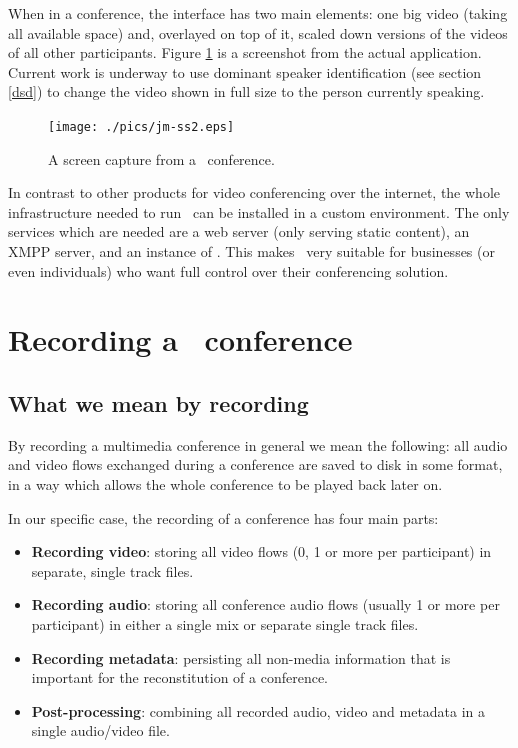 \documentclass[twoside,openright,a4paper,12pt,english]{article}
\begin{document}
When in a conference, the interface has two main elements: one big video
(taking all available space) and, overlayed on top of it,
scaled down versions of the videos of all other participants. Figure
\ref{jm-ss} is a screenshot from the actual application. Current work is underway to
use dominant speaker identification (see section \ref{dsd}) to change the video
shown in full size to the person currently speaking.

\begin{figure}[h]
    \texttt{[image: ./pics/jm-ss2.eps]}
    \caption{A screen capture from a \jm\ conference.}
    \label{jm-ss}
\end{figure}

\medskip
In contrast to other products for video conferencing over the internet, the
whole infrastructure needed to run \jm\ can be installed in a custom
environment. The only services which are needed are a web server
(only serving static content), an XMPP server, and an instance of \jvb. This
makes \jm\ very suitable for businesses (or even individuals) who want full
control over their conferencing solution.



\section{Recording a \jm\ conference}
\label{intro-recording}

\subsection{What we mean by recording}
By recording a multimedia conference in general we mean the following: 
all audio and video flows exchanged during a conference are saved
to disk in some format, in a way which allows the whole conference to
be played back later on.

\medskip
In our specific case, the recording of a conference has four main parts:
\begin{itemize}
\item{\textbf{Recording video}: storing all video flows (0, 1 or more per participant) in separate, single track files.}
\item{\textbf{Recording audio}: storing all conference audio flows (usually 1 or more per participant) in either a single mix or separate single track files.}
\item{\textbf{Recording metadata}: persisting all non-media information that is important for the reconstitution of a conference.}
\item{\textbf{Post-processing}: combining all recorded audio, video and metadata in a single audio/video file.}
\end{itemize}
\end{document}
